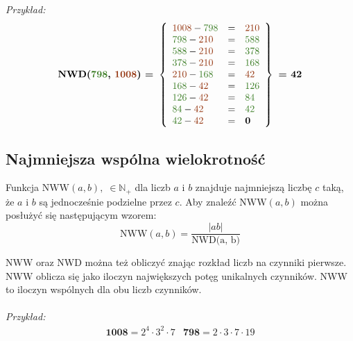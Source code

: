 \documentclass[14pt,a4paper]{extarticle}
\begin{document}
\renewcommand{\arraycolsep}{0.5cm}
\renewcommand{\arraystretch}{1.4}



\noindent\textit{Przykład: }
\begin{equation*}
   \textbf{NWD(\textcolor{OliveGreen}{798}, \textcolor{RawSienna}{1008}) = }\left\{
\begin{array}{lcl}
   \textcolor{RawSienna}{1008} - \textcolor{OliveGreen}{798} & = & \textcolor{RawSienna}{210}\\
   \textcolor{OliveGreen}{798} - \textcolor{RawSienna}{210} & = & \textcolor{OliveGreen}{588}\\
   \textcolor{OliveGreen}{588} - \textcolor{RawSienna}{210} & = & \textcolor{OliveGreen}{378}\\
   \textcolor{OliveGreen}{378} - \textcolor{RawSienna}{210} & = & \textcolor{OliveGreen}{168}\\
   \textcolor{RawSienna}{210} - \textcolor{OliveGreen}{168} & = & \textcolor{RawSienna}{42}\\
   \textcolor{OliveGreen}{168} - \textcolor{RawSienna}{42} & = & \textcolor{OliveGreen}{126}\\
   \textcolor{OliveGreen}{126} - \textcolor{RawSienna}{42} & = & \textcolor{OliveGreen}{84}\\
   \textcolor{OliveGreen}{84} - \textcolor{RawSienna}{42} & = & \textcolor{OliveGreen}{42}\\
   \textcolor{OliveGreen}{42} - \textcolor{RawSienna}{42} & = & \textbf{0}
\end{array}
   \right\}\textbf{ = 42}
\end{equation*}
\newpage

\noindent\subsection{Najmniejsza wspólna wielokrotność}
Funkcja $\text{NWW}(a, b),\;\in\mathbb{N}_{+}$ dla liczb $a$ i $b$ znajduje najmniejszą liczbę $c$ taką, że
$a$ i $b$ są jednocześnie podzielne przez $c$. Aby znaleźć $\text{NWW}(a, b)$ można posłużyć
się następującym wzorem:
$$\text{NWW}(a, b) = \frac{\vert ab \vert}{\text{NWD(a, b)}}$$

\noindent NWW oraz NWD można też obliczyć znając rozkład liczb na czynniki pierwsze. NWW oblicza się jako
iloczyn największych potęg unikalnych czynników. NWW to iloczyn wspólnych dla obu liczb
czynników.\\\\
\textit{Przykład:}
\begin{equation*}
\begin{array}{cc}
   \textbf{1008} = 2^{4} \cdot 3^{2} \cdot 7 & \textbf{798} = 2 \cdot 3 \cdot 7 \cdot 19\\
\end{array}
\end{equation*}
\end{document}
